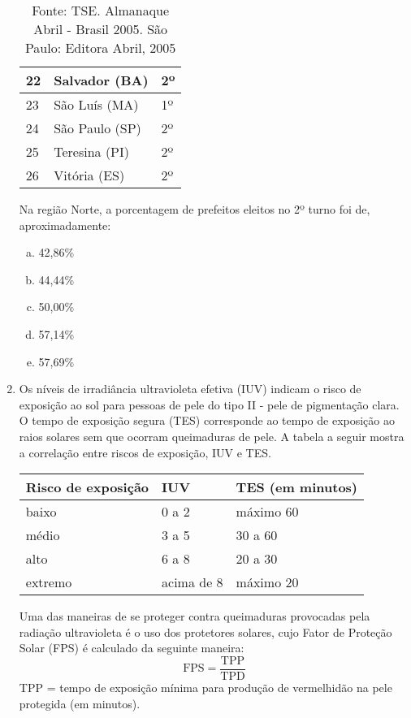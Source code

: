 \documentclass[a4paper,14pt]{article}
\begin{document}
\begin{multicols}{2}
\begin{enumerate}
\begin{table}[H]
\begin{tabular}{|p{0.4cm}|p{4.6cm}|p{2cm}|}
					22 & Salvador (BA) & 2º \\ \hline
					23 & São Luís (MA) & 1º \\ \hline
					24 & São Paulo (SP) & 2º \\ \hline
					25 & Teresina (PI) & 2º \\ \hline
					26 & Vitória (ES) & 2º \\ \hline
				\end{tabular}
				\caption*{Fonte: TSE. Almanaque Abril - Brasil 2005. São Paulo: Editora Abril, 2005 }
			\end{table}
			Na região Norte, a porcentagem de prefeitos eleitos no 2º turno foi de, aproximadamente:
			\begin{enumerate}[a)]
				\item 42,86\%
				\item 44,44\%
				\item 50,00\%
				\item 57,14\%
				\item 57,69\%
			\end{enumerate}
			\item Os níveis de irradiância ultravioleta efetiva (IUV) indicam o risco de exposição ao sol para pessoas de pele do tipo II - pele de pigmentação clara. O tempo de exposição segura (TES) corresponde ao tempo de exposição ao raios solares sem que ocorram queimaduras de pele. A tabela a seguir mostra a correlação entre riscos de exposição, IUV e TES.
			\begin{table}[H]
				\begin{tabular}{|p{2.2cm}|p{2.2cm}|p{2.2cm}|}
					\hline
					\textbf{Risco de exposição} & \textbf{IUV} & \textbf{TES (em minutos)} \\ \hline
					baixo & 0 a 2 & máximo 60 \\ \hline
					médio & 3 a 5 & 30 a 60 \\ \hline
					alto & 6 a 8 & 20 a 30 \\ \hline
					extremo & acima de 8 & máximo 20 \\ \hline
				\end{tabular}
			\end{table}
			Uma das maneiras de se proteger contra queimaduras provocadas pela radiação ultravioleta é o uso dos protetores solares, cujo Fator de Proteção Solar (FPS) é calculado da seguinte maneira:
			\begin{equation*}
				\text{FPS} = \frac{\text{TPP}}{\text{TPD}}
			\end{equation*}
			TPP = tempo de exposição mínima para produção de vermelhidão na pele protegida (em minutos). \\

\end{enumerate}
\end{multicols}
\end{document}
